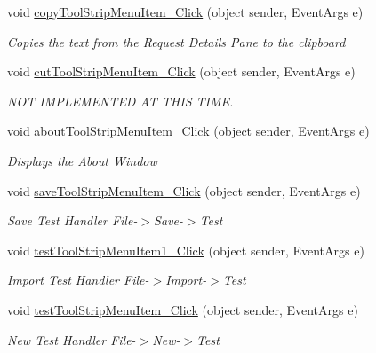 \begin{DoxyCompactItemize}
void \mbox{\hyperlink{class_cert_complete_1_1_cert_complete_a03ef12ca613588ff661204dcaf08505a}{copy\+Tool\+Strip\+Menu\+Item\+\_\+\+Click}} (object sender, Event\+Args e)
\begin{DoxyCompactList}\small\item\em Copies the text from the Request Details Pane to the clipboard \end{DoxyCompactList}\item 
void \mbox{\hyperlink{class_cert_complete_1_1_cert_complete_ac678e87c8fcaa0d6408476e76ac975e4}{cut\+Tool\+Strip\+Menu\+Item\+\_\+\+Click}} (object sender, Event\+Args e)
\begin{DoxyCompactList}\small\item\em N\+OT I\+M\+P\+L\+E\+M\+E\+N\+T\+ED AT T\+H\+IS T\+I\+ME. \end{DoxyCompactList}\item 
void \mbox{\hyperlink{class_cert_complete_1_1_cert_complete_a70a729491aaf8b3158747d67b6999117}{about\+Tool\+Strip\+Menu\+Item\+\_\+\+Click}} (object sender, Event\+Args e)
\begin{DoxyCompactList}\small\item\em Displays the About Window \end{DoxyCompactList}\item 
void \mbox{\hyperlink{class_cert_complete_1_1_cert_complete_a917367d3079b5e2dc1bf10548e5e9ef5}{save\+Tool\+Strip\+Menu\+Item\+\_\+\+Click}} (object sender, Event\+Args e)
\begin{DoxyCompactList}\small\item\em Save Test Handler File-\/$>$Save-\/$>$Test \end{DoxyCompactList}\item 
void \mbox{\hyperlink{class_cert_complete_1_1_cert_complete_ac5edc7874ac8469eae717cf5af09de47}{test\+Tool\+Strip\+Menu\+Item1\+\_\+\+Click}} (object sender, Event\+Args e)
\begin{DoxyCompactList}\small\item\em Import Test Handler File-\/$>$Import-\/$>$Test \end{DoxyCompactList}\item 
void \mbox{\hyperlink{class_cert_complete_1_1_cert_complete_a11656358c9c66db6838e114db57168e5}{test\+Tool\+Strip\+Menu\+Item\+\_\+\+Click}} (object sender, Event\+Args e)
\begin{DoxyCompactList}\small\item\em New Test Handler File-\/$>$New-\/$>$Test \end{DoxyCompactList}\item 

\end{DoxyCompactItemize}
